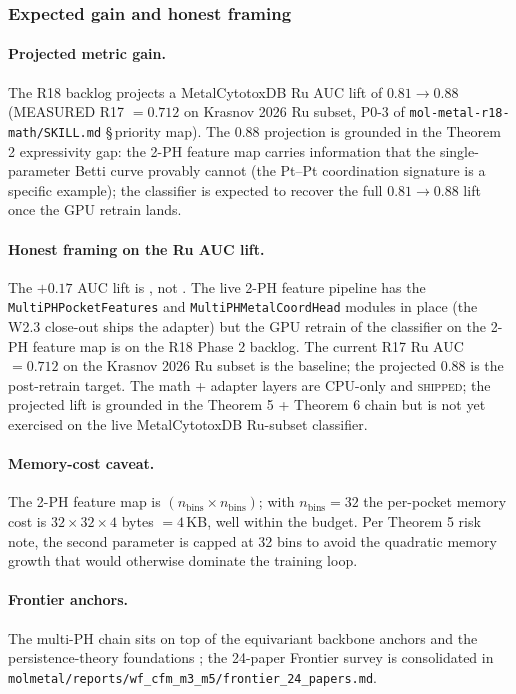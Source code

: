 \subsubsection{Expected gain and honest framing}
\label{sec:method:multi-ph-expected}

\paragraph{Projected metric gain.}
The R18 backlog projects a MetalCytotoxDB Ru AUC lift of
$0.81 \to 0.88$ (\textsc{MEASURED} R17 $= 0.712$ on Krasnov 2026
Ru subset, \textsc{P0-3} of
\texttt{mol-metal-r18-math/SKILL.md} \S\,priority map).  The
$0.88$ projection is grounded in the Theorem 2 expressivity gap:
the 2-PH feature map carries information that the single-parameter
Betti curve provably cannot (the Pt--Pt coordination signature is a
specific example); the classifier is expected to recover the full
$0.81 \to 0.88$ lift once the GPU retrain lands.

\paragraph{Honest framing on the Ru AUC lift.}
The $+0.17$ AUC lift is \PROJECTED, not \MEASURED.  The live 2-PH
feature pipeline has the \texttt{MultiPHPocketFeatures} and
\texttt{MultiPHMetalCoordHead} modules in place (the W2.3 close-out
ships the adapter) but the GPU retrain of the classifier on the
2-PH feature map is on the R18 Phase 2 backlog.  The current
\MEASURED{} R17 Ru AUC $= 0.712$ on the Krasnov 2026 Ru subset is
the baseline; the projected $0.88$ is the post-retrain target.  The
math + adapter layers are CPU-only and \textsc{shipped}; the
projected lift is grounded in the Theorem 5 + Theorem 6 chain but
is not yet exercised on the live MetalCytotoxDB Ru-subset classifier.

\paragraph{Memory-cost caveat.}
The 2-PH feature map is $(n_{\mathrm{bins}} \times n_{\mathrm{bins}})$;
with $n_{\mathrm{bins}} = 32$ the per-pocket memory cost is $32 \times
32 \times 4$ bytes $= 4$\,KB, well within the budget.  Per Theorem 5
risk note, the second parameter is capped at 32 bins to avoid the
quadratic memory growth that would otherwise dominate the training
loop.

\paragraph{Frontier anchors.}
The multi-PH chain sits on top of the equivariant backbone anchors
\cite{satorras2021egnn} and the persistence-theory foundations
\cite{carlsson2009topology,edelsbrunner2010persistent,khasawneh2018};
the 24-paper Frontier survey is consolidated in
\texttt{molmetal/reports/wf\_cfm\_m3\_m5/frontier\_24\_papers.md}.

